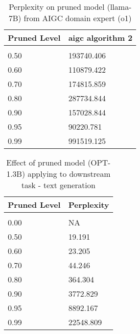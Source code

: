 \documentclass{article} %
\begin{document}
\begin{table}[t]
\caption{Perplexity on pruned model (llama-7B) from AIGC domain expert (o1)}
\label{sample-table-5}
\begin{center}
\begin{tabular}{ll}
\multicolumn{1}{c}{\bf Pruned Level}  &\multicolumn{1}{c}{\bf aigc algorithm 2}
\\ \hline \\
0.50         &193740.406 \\
0.60         &110879.422 \\
0.70         &174815.859 \\
0.80         &287734.844 \\
0.90         &157028.844 \\
0.95         &90220.781 \\
0.99         &991519.125 \\
\end{tabular}
\end{center}
\end{table}

\begin{table}[t]
\caption{Effect of pruned model (OPT-1.3B) applying to downstream task - text generation}
\label{sample-table-6}
\begin{center}
\begin{tabular}{ll}
\multicolumn{1}{c}{\bf Pruned Level}  &\multicolumn{1}{c}{\bf Perplexity}
\\ \hline \\
0.00         &NA \\
0.50         &19.191 \\
0.60         &23.205 \\
0.70         &44.246 \\
0.80         &364.304 \\
0.90         &3772.829 \\
0.95         &8892.167 \\
0.99         &22548.809 \\
\end{tabular}
\end{center}
\end{table}
\end{document}

